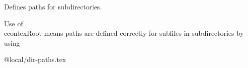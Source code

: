 \documentclass{article}
\begin{document}
Defines paths for subdirectories.

Use of \\econtexRoot means paths are defined correctly for subfiles in subdirectories by using \texttt{}

\begin{verbatimwrite}{@local/dir-paths.tex}
\providecommand{\ApndxDir}{}\renewcommand{\ApndxDir}{\econtexRoot/Appendices}
\providecommand{\EqDir}{}\renewcommand{\EqDir}{\econtexRoot/Equations}
\providecommand{\TableDir}{}\renewcommand{\TableDir}{\econtexRoot/Tables}
\providecommand{\FigDir}{}\renewcommand{\FigDir}{\econtexRoot/Figures}
\providecommand{\LaTeXInputs}{}\renewcommand{\LaTeXInputs}{\econtexRoot/@resources/texlive/texmf-local/tex/latex}
\providecommand{\LaTeXGenerated}{}\renewcommand{\LaTeXGenerated}{\econtexRoot} %
\providecommand{\ResourcesDir}{}\renewcommand{\ResourcesDir}{\econtexRoot/@resources}
\providecommand{\LtxDir}{}\renewcommand{\LtxDir}{}
\end{verbatimwrite}
\end{document}
